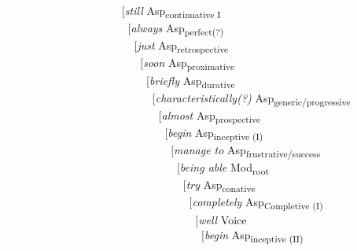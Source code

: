 \begin{exe}
{\textcolor{white}{nnnnnnnnnnnnnnnnnnn}$[$\textit{still} Asp\textsubscript{continuative I} \\
\textcolor{white}{nnnnnnnnnnnnnnnnnnnn}$[$\textit{always} Asp\textsubscript{perfect(?)} \\
\textcolor{white}{nnnnnnnnnnnnnnnnnnnnn}$[$\textit{just} Asp\textsubscript{retrospective} \\
\textcolor{white}{nnnnnnnnnnnnnnnnnnnnnn}$[$\textit{soon} Asp\textsubscript{proximative} \\
\textcolor{white}{nnnnnnnnnnnnnnnnnnnnnnn}$[$\textit{briefly} Asp\textsubscript{durative} \\
\textcolor{white}{nnnnnnnnnnnnnnnnnnnnnnnn}$[$\textit{characteristically(?)} Asp\textsubscript{generic/progressive} \\
\textcolor{white}{nnnnnnnnnnnnnnnnnnnnnnnnn}$[$\textit{almost} Asp\textsubscript{prospective} \\
\textcolor{white}{nnnnnnnnnnnnnnnnnnnnnnnnnn}$[$\textit{begin} Asp\textsubscript{inceptive (I)} \\
\textcolor{white}{nnnnnnnnnnnnnnnnnnnnnnnnnnn}$[$\textit{manage to} Asp\textsubscript{frustrative/success} \\
\textcolor{white}{nnnnnnnnnnnnnnnnnnnnnnnnnnnn}$[$\textit{being able} Mod\textsubscript{root} \\
\textcolor{white}{nnnnnnnnnnnnnnnnnnnnnnnnnnnnn}$[$\textit{try} Asp\textsubscript{conative} \\
\textcolor{white}{nnnnnnnnnnnnnnnnnnnnnnnnnnnnnn}$[$\textit{completely} Asp\textsubscript{Completive (I)} \\
\textcolor{white}{nnnnnnnnnnnnnnnnnnnnnnnnnnnnnnn}$[$\textit{well} Voice \\
\textcolor{white}{nnnnnnnnnnnnnnnnnnnnnnnnnnnnnnnn}$[$\textit{begin} Asp\textsubscript{inceptive (II)} \\
}
\end{exe}

